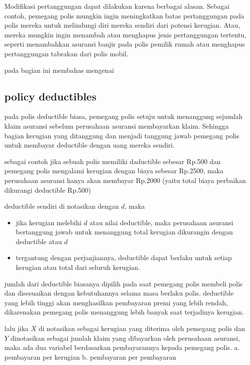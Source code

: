 \documentclass[
]{book}
\begin{document}
Modifikasi pertanggungan dapat dilakukan karena berbagai alasan. Sebagai contoh, pemegang polis mungkin ingin meningkatkan batas pertanggungan pada polis mereka untuk melindungi diri mereka sendiri dari potensi kerugian. Atau, mereka mungkin ingin menambah atau menghapus jenis pertanggungan tertentu, seperti menambahkan asuransi banjir pada polis pemilik rumah atau menghapus pertanggungan tabrakan dari polis mobil.

pada bagian ini membahas mengenai

\hypertarget{policy-deductibles}{%
\subsection{policy deductibles}\label{policy-deductibles}}

pada polis deductible biasa, pemegang polis setuju untuk menanggung sejumlah klaim asuransi sebelum perusahaan asuransi membayarkan klaim. Sehingga bagian kerugian yang ditanggung dan menjadi tanggung jawab pemegang polis untuk membayar deductible dengan uang mereka sendiri.

sebagai contoh jika sebuah polis memiliki daductible sebesar Rp.500 dan pemegang polis mengalami kerugian dengan biaya sebesar Rp.2500, maka perusahaan asuransi hanya akan membayar Rp.2000 (yaitu total biaya perbaikan dikurangi deductible Rp.500)

deductible sendiri di notasikan dengan \(d\), maka

\begin{itemize}
\item
  jika kerugian melebihi \(d\) atau nilai deductible, maka perusahaan asuransi bertanggung jawab untuk menanggung total kerugian dikurangin dengan deductible atau \(d\)
\item
  tergantung dengan perjanjiannya, deductible dapat berlaku untuk setiap kerugian atau total dari seluruh kerugian.
\end{itemize}

jumlah dari deductible biasanya dipilih pada saat pemegang polis membeli polis dan disesuaikan dengan kebutuhannya selama masa berlaku polis. deductible yang lebih tinggi akan menghasilkan pembayaran premi yang lebih rendah, dikarenakan pemegang polis menanggung lebih banyak saat terjadinya kerugian.

lalu jika \(X\) di notasikan sebagai kerugian yang diterima oleh pemegang polis dan \(Y\) dinotasikan sebagai jumlah klaim yang dibayarkan oleh perusahaan asuransi, maka ada dua variabel berdasarkan pembayarannya kepada pemegang polis.
a. pembayaran per kerugian
b. pembayaran per pembayaran
\end{document}
